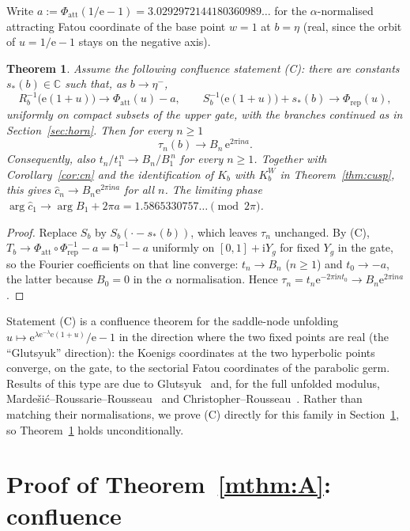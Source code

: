 \documentclass[11pt]{amsart}
\newtheorem{theorem}{Theorem}[section]
\theoremstyle{definition}
\newcommand{\Rr}{R}
\newcommand{\Kk}{K}
\newcommand{\eee}{\mathrm{e}}
\newcommand{\ii}{\mathrm{i}}
\begin{document}
Write $a:=\Phi_{\mathrm{att}}(1/\eee-1)=3.0292972144180360989\ldots$ for the
$\alpha$-normalised attracting Fatou coordinate of the base point $w=1$ at
$b=\eta$ (real, since the orbit of $u=1/\eee-1$ stays on the negative axis).

\begin{theorem}\label{thm:reduction}
Assume the following confluence statement \textup{(C)}: there are constants
$s_*(b)\in\mathbb C$ such that, as $b\to\eta^-$,
\[
 \Rr_b^{-1}\bigl(\eee(1+u)\bigr)\to\Phi_{\mathrm{att}}(u)-a,\qquad
 S_b^{-1}\bigl(\eee(1+u)\bigr)+s_*(b)\to\Phi_{\mathrm{rep}}(u),
\]
uniformly on compact subsets of the upper gate, with the branches continued as
in Section~\ref{sec:horn}.  Then for every $n\ge1$
\[
 \tau_n(b)\longrightarrow B_n\,\eee^{2\pi\ii na}.
\]
Consequently, also
$t_n/t_1^{\,n}\to B_n/B_1^{\,n}$ for every $n\ge1$.
Together with Corollary~\ref{cor:cn} and the identification of
$\Kk_b$ with $\Kk^W_b$ in Theorem~\ref{thm:cusp}, this gives
$\hat c_n\to B_n\eee^{2\pi\ii na}$ for all $n$.  The limiting phase
$\arg\hat c_1\to\arg B_1+2\pi a=1.5865330757\ldots\pmod{2\pi}$.
\end{theorem}

\begin{proof}
Replace $S_b$ by $S_b(\cdot-s_*(b))$, which leaves $\tau_n$ unchanged.  By (C),
$T_b\to\Phi_{\mathrm{att}}\circ\Phi_{\mathrm{rep}}^{-1}-a=\mathfrak h^{-1}-a$ uniformly
on $[0,1]+\ii Y_g$ for fixed $Y_g$ in the gate, so the Fourier coefficients on
that line converge: $t_n\to B_n$ ($n\ge1$) and $t_0\to-a$, the latter because
$B_0=0$ in the $\alpha$ normalisation.  Hence
$\tau_n=t_n\eee^{-2\pi\ii nt_0}\to B_n\eee^{2\pi\ii na}$.
\end{proof}

Statement (C) is a confluence theorem for the saddle-node unfolding
$u\mapsto \eee^{\lambda\eee^{-\lambda}\eee(1+u)}/\eee-1$ in the direction where the
two fixed points are real (the ``Glutsyuk'' direction): the Koenigs
coordinates at the two hyperbolic points converge, on the gate, to the
sectorial Fatou coordinates of the parabolic germ.  Results of this type are
due to Glutsyuk~\cite{Glutsyuk2001} and, for the full unfolded modulus,
Marde\v{s}i\'c--Roussarie--Rousseau~\cite{MRR2004} and
Christopher--Rousseau~\cite{ChristopherRousseau}.  Rather than matching their
normalisations, we prove (C) directly for this family in
Section~\ref{sec:proofC}, so Theorem~\ref{thm:reduction} holds unconditionally.

\section{Proof of Theorem~\ref{mthm:A}: confluence}\label{sec:proofC}
\end{document}
